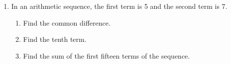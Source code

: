\documentclass[12pt, twoside]{article}
\begin{document}
\begin{enumerate}
\item In an arithmetic sequence, the first term is 5 and the second term is 7.
\begin{enumerate}
    \item Find the common difference.
        \begin{flushright}[2]\end{flushright}
    \item Find the tenth term.\\[50pt]
        \begin{flushright}[2]\end{flushright}
    \item Find the sum of the first fifteen terms of the sequence. \\[50pt]
        \begin{flushright}[2]\end{flushright}
\end{enumerate}

\end{enumerate}
\end{document}
